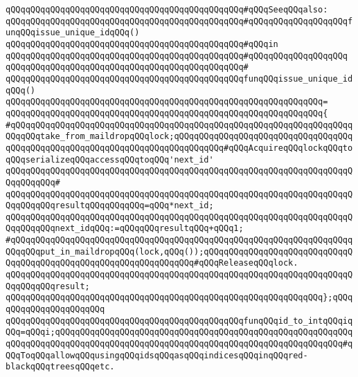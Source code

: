 \newline
\verb|qQQqqQQqqQQqqQQqqQQqqQQqqQQqqQQqqQQqqQQqqQQqqQQq#qQQqSeeqQQqalso:|\newline
\verb|qQQqqQQqqQQqqQQqqQQqqQQqqQQqqQQqqQQqqQQqqQQqqQQq#qQQqqQQqqQQqqQQqqQQqfunqQQqissue_unique_idqQQq()|\newline
\verb|qQQqqQQqqQQqqQQqqQQqqQQqqQQqqQQqqQQqqQQqqQQqqQQq#qQQqin|\newline
\verb|qQQqqQQqqQQqqQQqqQQqqQQqqQQqqQQqqQQqqQQqqQQqqQQq#qQQqqQQqqQQqqQQqqQQq|\newline
\verb|qQQqqQQqqQQqqQQqqQQqqQQqqQQqqQQqqQQqqQQqqQQqqQQq#|\newline
\verb|qQQqqQQqqQQqqQQqqQQqqQQqqQQqqQQqqQQqqQQqqQQqqQQqfunqQQqissue_unique_idqQQq()|\newline
\verb|qQQqqQQqqQQqqQQqqQQqqQQqqQQqqQQqqQQqqQQqqQQqqQQqqQQqqQQqqQQqqQQq=|\newline
\verb|qQQqqQQqqQQqqQQqqQQqqQQqqQQqqQQqqQQqqQQqqQQqqQQqqQQqqQQqqQQqqQQq{|\newline
\verb|#qQQqqQQqqQQqqQQqqQQqqQQqqQQqqQQqqQQqqQQqqQQqqQQqqQQqqQQqqQQqqQQqqQQqqQQqqQQqtake_from_maildropqQQqlock;qQQqqQQqqQQqqQQqqQQqqQQqqQQqqQQqqQQqqQQqqQQqqQQqqQQqqQQqqQQqqQQqqQQqqQQqqQQqqQQq#qQQqAcquireqQQqlockqQQqtoqQQqserializeqQQqaccessqQQqtoqQQq'next_id'|\newline
\verb|qQQqqQQqqQQqqQQqqQQqqQQqqQQqqQQqqQQqqQQqqQQqqQQqqQQqqQQqqQQqqQQqqQQqqQQqqQQqqQQq#|\newline
\verb|qQQqqQQqqQQqqQQqqQQqqQQqqQQqqQQqqQQqqQQqqQQqqQQqqQQqqQQqqQQqqQQqqQQqqQQqqQQqqQQqresultqQQqqQQqqQQq=qQQq*next_id;|\newline
\verb|qQQqqQQqqQQqqQQqqQQqqQQqqQQqqQQqqQQqqQQqqQQqqQQqqQQqqQQqqQQqqQQqqQQqqQQqqQQqqQQqnext_idqQQq:=qQQqqQQqresultqQQq+qQQq1;|\newline
\newline
\verb|#qQQqqQQqqQQqqQQqqQQqqQQqqQQqqQQqqQQqqQQqqQQqqQQqqQQqqQQqqQQqqQQqqQQqqQQqqQQqput_in_maildropqQQq(lock,qQQq());qQQqqQQqqQQqqQQqqQQqqQQqqQQqqQQqqQQqqQQqqQQqqQQqqQQqqQQqqQQqqQQqqQQq#qQQqReleaseqQQqlock.|\newline
\newline
\verb|qQQqqQQqqQQqqQQqqQQqqQQqqQQqqQQqqQQqqQQqqQQqqQQqqQQqqQQqqQQqqQQqqQQqqQQqqQQqqQQqresult;|\newline
\verb|qQQqqQQqqQQqqQQqqQQqqQQqqQQqqQQqqQQqqQQqqQQqqQQqqQQqqQQqqQQqqQQq};qQQqqQQqqQQqqQQqqQQqqQQq|\newline
\newline
\verb|qQQqqQQqqQQqqQQqqQQqqQQqqQQqqQQqqQQqqQQqqQQqqQQqfunqQQqid_to_intqQQqiqQQq=qQQqi;qQQqqQQqqQQqqQQqqQQqqQQqqQQqqQQqqQQqqQQqqQQqqQQqqQQqqQQqqQQqqQQqqQQqqQQqqQQqqQQqqQQqqQQqqQQqqQQqqQQqqQQqqQQqqQQqqQQqqQQqqQQqqQQq#qQQqToqQQqallowqQQqusingqQQqidsqQQqasqQQqindicesqQQqinqQQqred-blackqQQqtreesqQQqetc.|\newline

